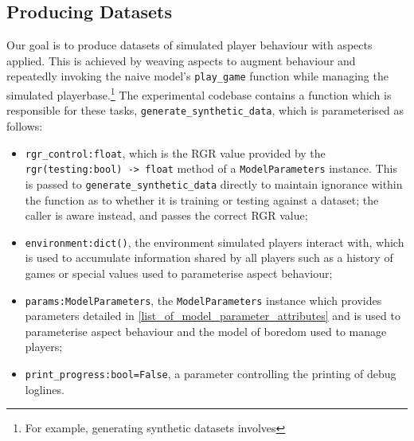 \subsection{Producing Datasets}\label{subsec:exp1_producing_datasets}


Our goal is to produce datasets of simulated player behaviour with aspects
applied. This is achieved by weaving aspects to augment behaviour and repeatedly
invoking the naive model's \lstinline{play_game} function while managing the
simulated playerbase.\footnote{For example, generating synthetic datasets
  involves } The experimental codebase contains
a function which is responsible for these tasks,
\lstinline{generate_synthetic_data}, which is parameterised as follows:

\begin{itemize}
  \item \lstinline{rgr_control:float}, which is the RGR value provided by the
  \lstinline{rgr(testing:bool) -> float} method of a \lstinline{ModelParameters}
  instance. This is passed to \lstinline{generate_synthetic_data} directly
  to maintain ignorance within the function as to whether it is training or
  testing against a dataset; the caller is aware instead, and passes the correct
  RGR value;
  \item \lstinline{environment:dict()}, the environment simulated players interact
  with, which is used to accumulate information shared by all players such as a
  history of games or special values used to parameterise aspect behaviour;
  \item \lstinline{params:ModelParameters}, the \lstinline{ModelParameters}
  instance which provides parameters detailed in
  \cref{list_of_model_parameter_attributes} and is used to parameterise aspect
  behaviour and the model of boredom used to manage players;
  \item \lstinline{print_progress:bool=False}, a parameter controlling the
  printing of debug loglines.
\end{itemize}

